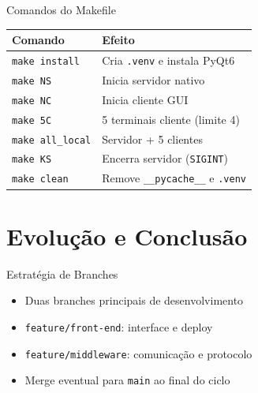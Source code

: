 \documentclass[aspectratio=169]{beamer}
\begin{document}
\begin{frame}{Comandos do Makefile}
  \footnotesize
  \begin{tabular}{ll}
    \toprule
    \textbf{Comando} & \textbf{Efeito} \\
    \midrule
    \texttt{make install} & Cria \texttt{.venv} e instala PyQt6 \\
    \texttt{make NS} & Inicia servidor nativo \\
    \texttt{make NC} & Inicia cliente GUI \\
    \texttt{make 5C} & 5 terminais cliente (limite 4) \\
    \texttt{make all\_local} & Servidor + 5 clientes \\
    \texttt{make KS} & Encerra servidor (\texttt{SIGINT}) \\
    \texttt{make clean} & Remove \texttt{\_\_pycache\_\_} e \texttt{.venv} \\
    \bottomrule
  \end{tabular}
\end{frame}

\section{Evolu\c{c}\~ao e Conclus\~ao}

\begin{frame}{Estrat\'egia de Branches}
  \begin{itemize}
    \item Duas branches principais de desenvolvimento
    \item \texttt{feature/front-end}: interface e deploy
    \item \texttt{feature/middleware}: comunica\c{c}\~ao e protocolo
    \item Merge eventual para \texttt{main} ao final do ciclo
  \end{itemize}
  \vfill
  \begin{center}
  \end{center}
\end{frame}
\end{document}
